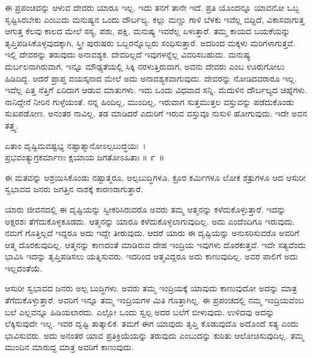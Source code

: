 ಈ ಪ್ರಪಂಚವನ್ನು ಆಳುವ ದೇವರು ಯಾರೂ ಇಲ್ಲ. ಇದು ತನಗೆ ತಾನೇ ಇದೆ. ಪ್ರತಿ ಯೊಂದನ್ನೂ ಯಾವನೋ ಒಬ್ಬ ಸೃಷ್ಟಿಸಿರಬೇಕು ಎಂಬುದು ಮನುಷ್ಯನ ಒಂದು ದೌರ್ಬಲ್ಯ. ಕಲ್ಲು ಮಣ್ಣು ಗಾಳಿ ಬೆಳಕು ಇವೆಲ್ಲ ಬಿದ್ದಿದೆ, ವಿಕಾಸವಾಗುತ್ತ ಆಗುತ್ತ ಕೆಲವು ಕಾಲದ ಮೇಲೆ ಸಸ್ಯ, ಪಶು, ಪಕ್ಷಿ, ಮನುಷ್ಯ ಇವರೆಲ್ಲ ಏಳುತ್ತಾರೆ. ತಮ್ಮ ಕಾಯದ ಬಯಕೆಯನ್ನು ತೃಪ್ತಿಪಡಿಸಿಕೊಳ್ಳವುದಕ್ಕಾಗಿ, ಸ್ತ್ರೀ ಪುರುಷರು ಒಬ್ಬರನ್ನೊಬ್ಬರು ಸಂಧಿಸುತ್ತಾರೆ. ಅದರಿಂದ ಮಕ್ಕಳು ಮರಿಗಳಾಗುತ್ತವೆ. ಇಲ್ಲಿ ದೇವರನ್ನು ತರುವುದು ಅನಾವಶ್ಯಕ. ದೇವರಿಲ್ಲದೆ ಇವುಗಳನ್ನೆಲ್ಲ ವಿವರಿಸಬಹುದು. ಮನುಷ್ಯ ದುರ್ಬಲನಾಗಿರುವಾಗ, ಇನ್ನೂ ಮೌಢ್ಯತೆಯಲ್ಲಿ ಸಿಕ್ಕಿ ನರಳುತ್ತಿರುವಾಗ, ಅವನು ದೇವರು ಎಂಬ ಊರುಗೋಲು ಹಿಡಿದಿದ್ದ. ಆದರೆ ಪ್ರಾಪ್ತ ವಯಸ್ಕನಾದ ಮೇಲೆ ಅದು ಅನಾವಶ್ಯಕವಾಗುವುದು. ದೇವರನ್ನು ನೋಡಿದವರಾರೂ ಇಲ್ಲ. ಇದೆಲ್ಲ ಪಿತ್ತ ನೆತ್ತಿಗೆ ಏರಿದಾಗ ಆಡುವ ಮಾತುಗಳು. ಇದು ಒಂದು ವಿಧವಾದ ಸನ್ನಿ. ಮೆದುಳಿನ ದೌರ್ಬಲ್ಯದ ಚಿಹ್ನೆಗಳು. ನಾನಿದ್ದೇನೆ ನೀರಿನ ಗುಳ್ಳೆಯಂತೆ. ನನ್ನ ಹಿಂದಿಲ್ಲ, ಮುಂದಿಲ್ಲ, ಇರುವಾಗ ಸುತ್ತಮುತ್ತಲ ವಸ್ತುವನ್ನು ಪಡೆದುಕೊಂಡು ಸುಖಪಡೋಣ. ಅನಂತರ ನಾವಿಲ್ಲ. ತಡ ಮಾಡಿದರೆ ಎದುರಿಗೆ ಇರುವ ವಸ್ತುವೂ ನುಸುಳಿ ಹೋಗುವುದು. ಇದೇ ಅವನ ತತ್ತ್ವ.

\begin{shloka}
ಏತಾಂ ದೃಷ್ಟಿಮವಷ್ಟಭ್ಯ ನಷ್ಟಾತ್ಮಾನೋಽಲ್ಪಬುದ್ಧಯಃ~।\\ಪ್ರಭವಂತ್ಯುಗ್ರಕರ್ಮಾಣಃ ಕ್ಷಯಾಯ ಜಗತೋಽಹಿತಾಃ \hfill॥ ೯~॥
\end{shloka}

\begin{artha}
ಈ ಮತವನ್ನು ಆಶ್ರಯಿಸಿಕೊಂಡು ನಷ್ಟಾತ್ಮರೂ, ಅಲ್ಪಬುದ್ಧಿಗಳೂ, ಕ್ರೂರ ಕರ್ಮಿಗಳೂ ಲೋಕ ಶತ್ರುಗಳೂ ಆದ ಆಸುರೀ ಸ್ವಭಾವದ ಜನರು ಜಗತ್ತಿನ ನಾಶಕ್ಕೆ ಕಾರಣರಾಗುತ್ತಾರೆ.
\end{artha}

\newpage

ಯಾರು ಜೀವನದಲ್ಲಿ ಈ ದೃಷ್ಟಿಯನ್ನು ಸ್ವೀಕರಿಸಿರುವರೊ ಅವರು ತಮ್ಮ ಆತ್ಮನನ್ನು ಕಳೆದು\-ಕೊಳ್ಳುತ್ತಾರೆ. ಇದನ್ನು ಅಕ್ಷರಶಃ ತೆಗೆದುಕೊಳ್ಳಕೂಡದು. ಆತ್ಮನನ್ನು ಯಾರೂ ಕಳೆದುಕೊಳ್ಳಲಾಗುವುದಿಲ್ಲ. ಅದು ಎಂದೆಂದಿಗೂ ಇರುವುದು. ನಮಗೆ ಗೊತ್ತಿಲ್ಲದೆ ಇದ್ದರೂ ಅದು ಇದ್ದೇ ತೀರುವುದು. ಆದರೆ ಯಾರು ಈ ದೃಷ್ಟಿಯನ್ನು ಅನುಸರಿಸುವರೊ ಅವರಿಗೆ ಆತ್ಮ ದೊರಕುವುದಿಲ್ಲ. ಆತ್ಮನನ್ನು ಕಾಣದಂತೆ ಮಾಡಿರುವ ದೇಹ ಇಂದ್ರಿಯ ಇವುಗಳು ದೊರಕುತ್ತವೆ. ಇದೇ ಸತ್ಯವೆಂದು ಭಾವಿಸಿ ಇದನ್ನು ತೃಪ್ತಿಪಡಿಸಲು ಯತ್ನಿಸುವರು. ಇದರಿಂದ ಆತ್ಮವಿದ್ದರೂ ಅದು ಕಾಣುವುದಿಲ್ಲ. ಅವರ ಪಾಲಿಗೆ ಅದು ಇಲ್ಲದಂತೆಯೆ.

ಆಸುರೀ ಸ್ವಭಾವದ ಜನರು ಅಲ್ಪ ಬುದ್ಧಿಗಳು. ಅವರು ತಮ್ಮ ಇಂದ್ರಿಯಕ್ಕೆ ಯಾವುದು ಕಾಣುವುದೋ ಅದನ್ನು ಮಾತ್ರ ತೆಗೆದುಕೊಳ್ಳುತ್ತಾರೆ. ಅವರಿಗೆ ಇನ್ನೂ ತಮ್ಮ ಇಂದ್ರಿಯಗಳ ಮಿತಿ ಗೊತ್ತಾಗಿಲ್ಲ. ಈ ಪ್ರಪಂಚದಲ್ಲಿ ನಮ್ಮ ಇಂದ್ರಿಯವೆಂಬ ಬಲೆ ಎಲ್ಲವನ್ನೂ ಹಿಡಿಯಲಾರದು. ಎಲ್ಲೋ ಒಂದು ಸ್ವಲ್ಪ ಅದರ ಬಲೆಗೆ ಬೀಳುವುದು. ಉಳಿದವು ಅದನ್ನು ಲೆಕ್ಕಿಸುವುದೇ ಇಲ್ಲ. ಇವರ ದೃಷ್ಟಿ ತಾತ್ಕಾಲಿಕ. ತಮಗೆ ಈಗ ಯಾವುದು ತೃಪ್ತಿ ಕೊಡುವುದೊ ಅದೊಂದೆ ಸತ್ಯ ಎಂದು ಭಾವಿಸುವರು. ಅದು ಅನಂತರ ಯಾವ ಪ್ರತಿಕ್ರಿಯೆಯನ್ನು ತರುವುದು ಎಂಬುದನ್ನು ಕುರಿತು ಆಲೋಚಿಸುವುದಿಲ್ಲ. ತಮ್ಮ ಮುಂದಿನ ಮಾರುದ್ದ ಮಾತ್ರ ಅವರಿಗೆ ಕಾಣುವುದು.

